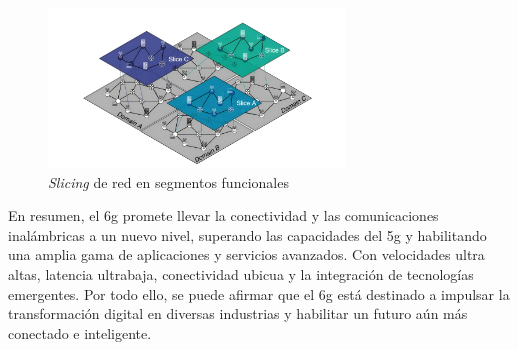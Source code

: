 \begin{figure}[h!]
    \centering
    \includegraphics[width=0.7\textwidth]{archivos/img/teoria/flex.jpg}
    \caption{\textit{Slicing} de red en segmentos funcionales \cite{qin20236g}}
    \label{fig:flex}
\end{figure}



En resumen, el \gls{6g} promete llevar la conectividad y las comunicaciones inalámbricas a un nuevo nivel, superando las capacidades del \gls{5g} y habilitando una amplia gama de aplicaciones y servicios avanzados. Con velocidades ultra altas, latencia ultrabaja, conectividad ubicua y la integración de tecnologías emergentes. Por todo ello, se puede afirmar que el \gls{6g} está destinado a impulsar la transformación digital en diversas industrias y habilitar un futuro aún más conectado e inteligente.


